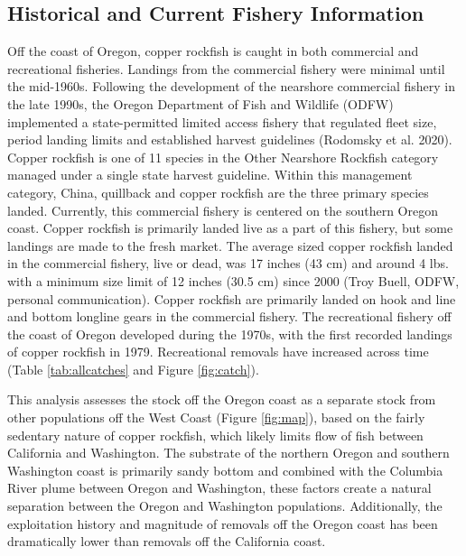 \documentclass[11pt,
  english,
  a4paper,
]{article}
\begin{document}
\leavevmode\tagmcend\tagstructend\par


\hypertarget{historical-and-current-fishery-information}{%
\subsection{Historical and Current Fishery Information}\label{historical-and-current-fishery-information}}

\leavevmode\tagmcend\tagstructend


Off the coast of Oregon, copper rockfish is caught in both commercial and recreational fisheries. Landings from the commercial fishery were minimal until the mid-1960s. Following the development of the nearshore commercial fishery in the late 1990s, the Oregon Department of Fish and Wildlife (ODFW) implemented a state-permitted limited access fishery that regulated fleet size, period landing limits and established harvest guidelines {(Rodomsky et al. 2020)\leavevmode\tagmcend\tagstructend}. Copper rockfish is one of 11 species in the Other Nearshore Rockfish category managed under a single state harvest guideline. Within this management category, China, quillback and copper rockfish are the three primary species landed. Currently, this commercial fishery is centered on the southern Oregon coast. Copper rockfish is primarily landed live as a part of this fishery, but some landings are made to the fresh market. The average sized copper rockfish landed in the commercial fishery, live or dead, was 17 inches (43 cm) and around 4 lbs. with a minimum size limit of 12 inches (30.5 cm) since 2000 (Troy Buell, ODFW, personal communication). Copper rockfish are primarily landed on hook and line and bottom longline gears in the commercial fishery. The recreational fishery off the coast of Oregon developed during the 1970s, with the first recorded landings of copper rockfish in 1979. Recreational removals have increased across time (Table \ref{tab:allcatches} and Figure \ref{fig:catch}).

\leavevmode\tagmcend\tagstructend\par


This analysis assesses the stock off the Oregon coast as a separate stock from other populations off the West Coast (Figure \ref{fig:map}), based on the fairly sedentary nature of copper rockfish, which likely limits flow of fish between California and Washington. The substrate of the northern Oregon and southern Washington coast is primarily sandy bottom and combined with the Columbia River plume between Oregon and Washington, these factors create a natural separation between the Oregon and Washington populations. Additionally, the exploitation history and magnitude of removals off the Oregon coast has been dramatically lower than removals off the California coast.
\end{document}
